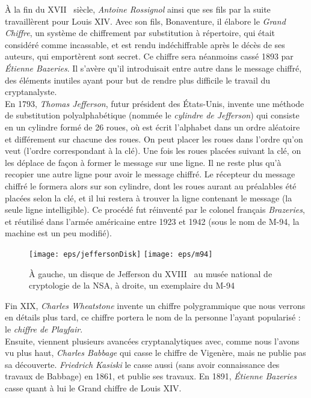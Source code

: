 À la fin du XVII\ieme~ siècle, \emph{Antoine Rossignol} ainsi que ses
fils par la suite travaillèrent pour Louis XIV. Avec son fils,
Bonaventure, il élabore le \emph{Grand Chiffre}, un système de
chiffrement par substitution à répertoire, qui était considéré comme
incassable, et est rendu indéchiffrable après le décès de ses auteurs,
qui emportèrent sont secret. Ce chiffre sera néanmoins cassé 1893 par
\emph{Étienne Bazeries}. Il s'avère qu'il introduisait entre autre
dans le message chiffré, des éléments inutiles ayant pour but de
rendre plus difficile le travail du cryptanalyste.\\

En 1793, \emph{Thomas Jefferson}, futur président des États-Unis,
invente une méthode de substitution polyalphabétique (nommée le
\emph{cylindre de Jefferson}) qui consiste en
un cylindre formé de 26 roues, où est écrit l'alphabet dans un ordre
aléatoire et différement sur chacune des roues. On peut placer les
roues dans l'ordre qu'on veut (l'ordre correspondant à la clé).
Une fois les roues placées suivant la clé, on les déplace de façon à
former le message sur une ligne. Il ne reste plus qu'à recopier une
autre ligne pour avoir le message chiffré. Le récepteur du message
chiffré le formera alors sur son cylindre, dont les roues aurant au
préalables été placées selon la clé, et il lui restera à trouver la
ligne contenant le message (la seule ligne intelligible). Ce procédé
fut réinventé par le colonel français \emph{Brazeries}, et réutilisé
dans l'armée américaine entre 1923 et 1942 (sous le nom de M-94, la
machine est un peu modifié).

\begin{figure}[h]
  \begin{center}
    \texttt{[image: eps/jeffersonDisk]}
    \hfill
    \texttt{[image: eps/m94]}
  \end{center}
  \caption{À gauche, un disque de Jefferson du XVIII\ieme~ au musée
    national de cryptologie de la NSA, 
    à droite, un exemplaire du M-94}
  \label{fig:JeffersonDisk}
\end{figure}

Fin XIX\ieme, \emph{Charles Wheatstone} invente un chiffre
polygrammique que nous verrons en détails plus tard, ce chiffre
portera le nom de la personne l'ayant popularisé : le \emph{chiffre
  de Playfair}. \\

Ensuite, viennent plusieurs avancées cryptanalytiques avec, comme nous
l'avons vu plus haut, \emph{Charles Babbage} qui casse le chiffre de
Vigenère, mais ne publie pas sa découverte. \emph{Friedrich Kasiski}
le casse aussi (sans avoir connaissance des travaux de
Babbage) en 1861, et publie ses travaux. En 1891, \emph{Étienne
  Bazeries} casse quant à lui le Grand chiffre de Louis XIV. 

